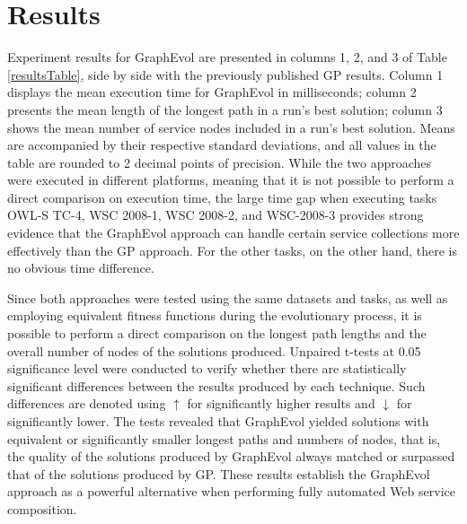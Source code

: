 \documentclass{article}
\begin{document}
\section{Results}\label{results}

 Experiment results for GraphEvol are presented in columns 1, 2, and 3 of Table \ref{resultsTable}, side by side with the previously published GP results. Column 1 displays the mean execution time for GraphEvol in milliseconds; column 2 presents the mean length of the longest path in a run's best solution; column 3 shows the mean number of service nodes included in a run's
 best solution. Means are accompanied by their respective standard deviations, and all values in the table are rounded to 2 decimal points of precision. While the two approaches were executed in different platforms, meaning that it is not possible to
 perform a direct comparison on execution time, the large time gap when executing tasks OWL-S TC-4, WSC 2008-1, WSC 2008-2, and WSC-2008-3 provides strong evidence that the GraphEvol approach can handle certain service collections more effectively than the GP approach. For the other tasks, on the other hand, there is no obvious time difference.

Since both approaches were tested using the same datasets and tasks, as well as employing equivalent fitness functions during the evolutionary process, it is possible to perform a direct comparison on the longest path lengths and the overall number of nodes of the solutions produced. Unpaired t-tests at 0.05 significance level were conducted to verify whether there are statistically
significant differences between the results produced by each technique. Such differences are denoted using $\uparrow$ for significantly higher results and $\downarrow$ for significantly lower. The tests revealed that GraphEvol yielded solutions with equivalent or significantly smaller longest paths and numbers of nodes, that is, the quality of the solutions produced by GraphEvol always matched or surpassed that of the solutions produced by GP. These results establish the GraphEvol approach as a powerful alternative when performing fully automated Web service composition.

\end{document}
